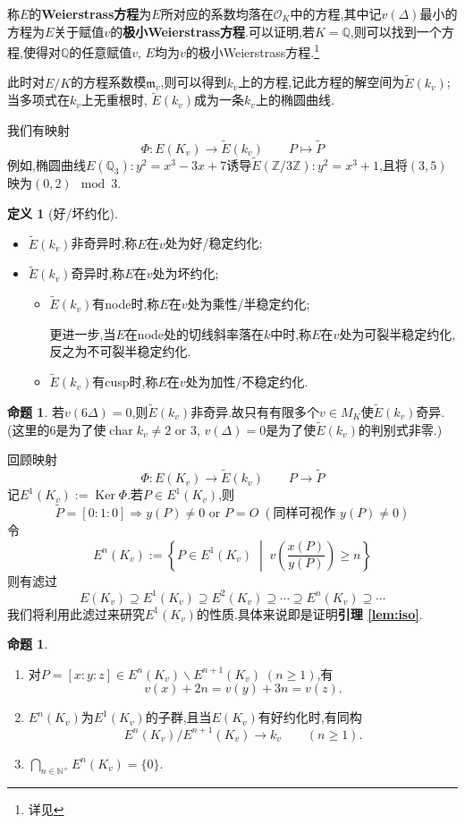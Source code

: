 \documentclass[12pt,A4paper,oneside,reqno]{amsart}
\numberwithin{equation}{section}
\theoremstyle{definition}
\newtheorem{proposition}[theorem]{命题}
\newtheorem{defn}[theorem]{定义}
\theoremstyle{plain}
\theoremstyle{plain}
\numberwithin{equation}{section}
\theoremstyle{remark}
\DeclareMathOperator{\cha}{\operatorname{char}}
\DeclareMathOperator{\Ker}{\operatorname{Ker}}
\begin{document}
	称$E$的\textbf{Weierstrass方程}为$E$所对应的系数均落在$\mathcal{O}_{K}$中的方程,其中记$v(\Delta)$最小的方程为$E$关于赋值$v$的\textbf{极小Weierstrass方程}.可以证明,若$K=\mathbb{Q}$,则可以找到一个方程,使得对$\mathbb{Q}$的任意赋值$v$, $E$均为$v$的极小Weierstrass方程.\footnote{详见\cite[p245, Corollary 8.3]{tate1974the}}
	
	此时对$E/K$的方程系数模$\mathfrak{m}_v$,则可以得到$k_v$上的方程,记此方程的解空间为$\tilde{E}(k_v)$;当多项式在$k_v$上无重根时, $\tilde{E}(k_v)$成为一条$k_v$上的椭圆曲线.
	
	我们有映射
	$$\Phi:E(K_v) \longrightarrow \tilde{E}(k_v) \qquad P \longmapsto \tilde{P}$$
	例如,椭圆曲线$E(\mathbb{Q}_3): y^2=x^3-3x+7$诱导$\tilde{E}(\mathbb{Z}/3\mathbb{Z}):y^2=x^3+1$,且将$(3,5)$映为$(0,2) \mod 3$.

\begin{defn}[好/坏约化]\
	\begin{itemize}
		\item $\tilde{E}(k_v)$非奇异时,称$E$在$v$处为好/稳定约化;
		\item 	$\tilde{E}(k_v)$奇异时,称$E$在$v$处为坏约化;
		\begin{itemize}
			\item $\tilde{E}(k_v)$有node时,称$E$在$v$处为乘性/半稳定约化;
			
			更进一步,当$E$在node处的切线斜率落在$k$中时,称$E$在$v$处为可裂半稳定约化,反之为不可裂半稳定约化.
			\item $\tilde{E}(k_v)$有cusp时,称$E$在$v$处为加性/不稳定约化.
		\end{itemize}
	\end{itemize}
\end{defn}
\begin{proposition}
	若$v(6\Delta)=0$,则$\tilde{E}(k_v)$非奇异.故只有有限多个$v\in M_K$使$\tilde{E}(k_v)$奇异.(这里的$6$是为了使$\cha k_v \neq 2$ or $3$, $v(\Delta)=0$是为了使$\tilde{E}(k_v)$的判别式非零.)
\end{proposition}
回顾映射
$$\Phi:E(K_v) \longrightarrow \tilde{E}(k_v) \qquad P \longrightarrow \tilde{P}$$
记$E^1(K_v):=\Ker \Phi$.若$P \in E^1(K_v)$,则
$$\tilde{P} =[0:1:0] \Longrightarrow y(P) \neq 0 \text{ or } P=O \;(\text{同样可视作 }y(P) \neq 0)$$
令
$$E^n(K_v):= \left\{ P \in E^1(K_v) \;\middle|\; v\left(\frac{x(P)}{y(P)}\right) \geqslant n \right\}$$
则有滤过
$$E(K_v) \supseteq E^1(K_v)\supseteq E^2(K_v)\supseteq \cdots \supseteq E^n(K_v)\supseteq \cdots$$
我们将利用此滤过来研究$E^1(K_v)$的性质.具体来说即是证明\textbf{引理 \ref{lem:iso}}.
\begin{proposition}\label{prop:E^n(K_v)}\
	\begin{enumerate}[1.]
	\item 对$P=[x:y:z] \in E^n(K_v) \smallsetminus E^{n+1}(K_v)\;(n \geqslant 1)$,有
	$$v(x)+2n=v(y)+3n =v(z).$$
	\item $E^n(K_v)$为$E^1(K_v)$的子群,且当$E(K_v)$有好约化时,有同构
	\begin{equation}\label{eq:fitereditem}
	E^{n}(K_v) / E^{n+1}(K_v) \longrightarrow k_v \qquad (n \geqslant 1).
	\end{equation}
	\item \label{item:complete}$\bigcap_{n \in \mathbb{N}^+}E^n(K_v)=\{0\}$.
	\end{enumerate}
\end{proposition}
\end{document}
